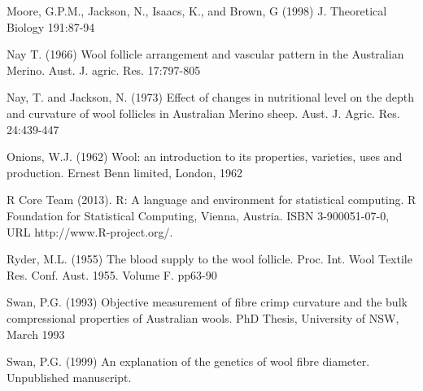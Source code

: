 \documentclass[titlepage]{article}  %
\begin{document}
\begin{thebibliography}{99}
Moore, G.P.M., Jackson, N., Isaacs, K., and Brown, G (1998) J. Theoretical Biology 191:87-94

Nay T. (1966) Wool follicle arrangement and vascular pattern in the Australian Merino. Aust. J. agric. Res. 17:797-805

Nay, T. and Jackson, N. (1973) Effect of changes in nutritional level on the depth and curvature of wool follicles in Australian Merino sheep. Aust. J. Agric. Res. 24:439-447

Onions, W.J. (1962) Wool: an introduction to its properties, varieties, uses
     and production. Ernest Benn limited, London, 1962

R Core Team (2013). R: A language and environment for statistical
  computing. R Foundation for Statistical Computing, Vienna, Austria.
  ISBN 3-900051-07-0, URL http://www.R-project.org/.

Ryder, M.L. (1955) The blood supply to the wool follicle. Proc. Int. Wool Textile Res. Conf. Aust. 1955. Volume F. pp63-90

Swan, P.G. (1993) Objective measurement of fibre crimp curvature and the bulk compressional properties of Australian wools. PhD Thesis, University of NSW, March 1993 

Swan, P.G. (1999) An explanation of the genetics of wool fibre diameter. Unpublished manuscript.

\end{thebibliography}
\end{document}
